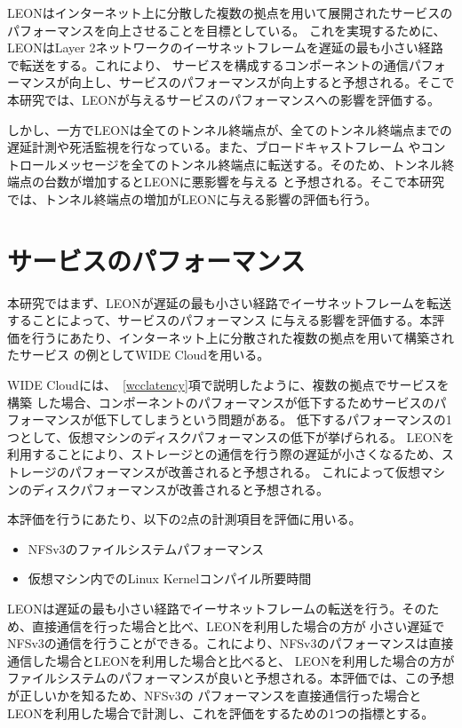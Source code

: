 LEONはインターネット上に分散した複数の拠点を用いて展開されたサービスのパフォーマンスを向上させることを目標としている。
これを実現するために、LEONはLayer 2ネットワークのイーサネットフレームを遅延の最も小さい経路で転送をする。これにより、
サービスを構成するコンポーネントの通信パフォーマンスが向上し、サービスのパフォーマンスが向上すると予想される。そこで
本研究では、LEONが与えるサービスのパフォーマンスへの影響を評価する。

しかし、一方でLEONは全てのトンネル終端点が、全てのトンネル終端点までの遅延計測や死活監視を行なっている。また、ブロードキャストフレーム
やコントロールメッセージを全てのトンネル終端点に転送する。そのため、トンネル終端点の台数が増加するとLEONに悪影響を与える
と予想される。そこで本研究では、トンネル終端点の増加がLEONに与える影響の評価も行う。

\section{サービスのパフォーマンス}

本研究ではまず、LEONが遅延の最も小さい経路でイーサネットフレームを転送することによって、サービスのパフォーマンス
に与える影響を評価する。本評価を行うにあたり、インターネット上に分散された複数の拠点を用いて構築されたサービス
の例としてWIDE Cloudを用いる。

WIDE Cloudには、~\ref{wcclatency}項で説明したように、複数の拠点でサービスを構築
した場合、コンポーネントのパフォーマンスが低下するためサービスのパフォーマンスが低下してしまうという問題がある。
低下するパフォーマンスの1つとして、仮想マシンのディスクパフォーマンスの低下が挙げられる。
LEONを利用することにより、ストレージとの通信を行う際の遅延が小さくなるため、ストレージのパフォーマンスが改善されると予想される。
これによって仮想マシンのディスクパフォーマンスが改善されると予想される。

本評価を行うにあたり、以下の2点の計測項目を評価に用いる。

\begin{itemize}
	\item{NFSv3のファイルシステムパフォーマンス}
	\item{仮想マシン内でのLinux Kernelコンパイル所要時間}
\end{itemize}

LEONは遅延の最も小さい経路でイーサネットフレームの転送を行う。そのため、直接通信を行った場合と比べ、LEONを利用した場合の方が
小さい遅延でNFSv3の通信を行うことができる。これにより、NFSv3のパフォーマンスは直接通信した場合とLEONを利用した場合と比べると、
LEONを利用した場合の方がファイルシステムのパフォーマンスが良いと予想される。本評価では、この予想が正しいかを知るため、NFSv3の
パフォーマンスを直接通信行った場合とLEONを利用した場合で計測し、これを評価をするための1つの指標とする。

